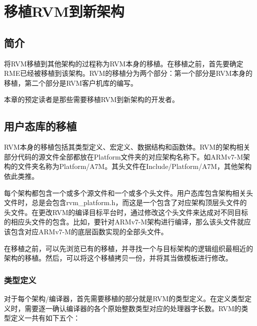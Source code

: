 \chapter{移植RVM到新架构}\label{ch:8-porting-rvm}

\section{简介}\label{sec:8-1}

将RVM移植到其他架构的过程称为RVM本身的移植。在移植之前，首先要确定RME已经被移植到该架构。RVM的移植分为两个部分：第一个部分是RVM本身的移植，第二个部分是RVM客户机库的编写。

本章的预定读者是那些需要移植RVM到新架构的开发者。

\section{用户态库的移植}\label{sec:8-2}

RVM本身的移植包括其类型定义、宏定义、数据结构和函数体。RVM的架构相关部分代码的源文件全部都放在Platform文件夹的对应架构名称下。如ARMv7-M架构的文件夹名称为Platform/A7M。其头文件在Include/Platform/A7M，其他架构依此类推。

每个架构都包含一个或多个源文件和一个或多个头文件。用户态库包含架构相关头文件时，总是会包含rvm\_platform.h，而这是一个包含了对应架构顶层头文件的头文件。在更改RVM的编译目标平台时，通过修改这个头文件来达成对不同目标的相应头文件的包含。比如，要针对ARMv7-M架构进行编译，那么该头文件就应该包含对应ARMv7-M的底层函数实现的全部头文件。

在移植之前，可以先浏览已有的移植，并寻找一个与目标架构的逻辑组织最相近的架构的移植。然后，可以将这个移植拷贝一份，并将其当做模板进行修改。

\subsection{类型定义}\label{subsec:8-2-1}

对于每个架构/编译器，首先需要移植的部分就是RVM的类型定义。在定义类型定义时，需要逐一确认编译器的各个原始整数类型对应的处理器字长数。RVM的类型定义一共有如下五个：

